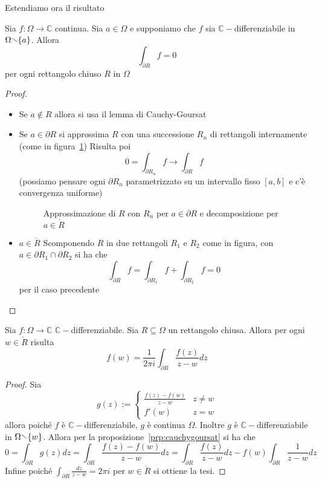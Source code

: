 Estendiamo ora il risultato
\begin{proposition}\label{prp:cauchygoursat}
    Sia \(f : \Omega \to \mathbb{C}\) continua. Sia \(a \in \Omega\) e
    supponiamo che \(f\) sia \(\mathbb{C}-\)differenziabile in \(\Omega \sminus
    \{a\} \). Allora 
    \[
        \int_{\partial R} f = 0
    \]
    per ogni rettangolo chiuso \(R\) in \(\Omega\) 
\end{proposition}
\begin{proof}
\begin{itemize}[label = --]
    \item Se \(a \not\in R\) allora si usa il lemma di Cauchy-Goursat
    \item Se \(a \in \partial R\) si approssima \(R\) con una successione
        \(R_{n}\) di rettangoli internamente (come in
        figura~\ref{fig:cauchygoursatapprox})
        Risulta poi 
        \[
            0 = \int_{\partial R_{n}} f \to \int_{\partial R} f
        \]
        (possiamo pensare ogni \(\partial R_{n}\) parametrizzato su un
        intervallo fisso \([a,b]\) e c'è convergenza uniforme)
\begin{figure}[ht]
    \centering
    \caption{Approssimazione di \(R\) con \(R_{n}\) per \(a \in \partial R\) e
    decomposizione per \(a \in \mathring{R}\)}
    \label{fig:cauchygoursatapprox}
\end{figure}
    \item \(a \in \mathring{R}\) Scomponendo \(R\) in due rettangoli \(R_{1}\) e
        \(R_{2}\) come in figura, con \(a \in \partial R_{1} \cap \partial
        R_{2}\) si ha che
        \[
            \int_{\partial R } f = \int_{\partial R_{1}} f + \int_{\partial
            R_{2}} f = 0
        \]
        per il caso precedente
\end{itemize}
\end{proof}

\begin{theorem} Sia \(f : \Omega \to
    \mathbb{C}\) \(\mathbb{C}-\)differenziabile. Sia \(R \subseteq \Omega \) un
    rettangolo chiusa. Allora per ogni \(w \in \mathring{R}\) risulta
    \[
        f(w) =\frac{1}{2\pi i} \int_{\partial R} \frac{f(z)}{z-w}dz
    \]
\end{theorem}
\begin{proof}
    Sia 
    \[
        g(z) := \begin{cases}
            \frac{f(z) - f(w)}{z-w} & z \neq w \\
            f'(w) & z = w
        \end{cases}
    \]
    allora poiché \(f\) è \(\mathbb{C}-\)differenziabile, \(g\) è continua
    \(\Omega\). Inoltre \(g\) è \(\mathbb{C}-\)differenziabile in \(\Omega
    \sminus \{w\} \). Allora per la proposizione~\ref{prp:cauchygoursat} si ha
    che
    \[
        0 = \int_{\partial R} g(z) dz = \int_{\partial R} \frac{f(z) -
        f(w)}{z-w} dz = \int_{\partial R} \frac{f(z)}{z-w} dz - f(w)
        \int_{\partial R} \frac{1}{z-w} dz
    \]
    Infine poiché \(\int_{\partial R} \frac{dz}{z-w} = 2\pi i \) per \(w \in
    \mathring{R}\) si ottiene la tesi.
\end{proof}

